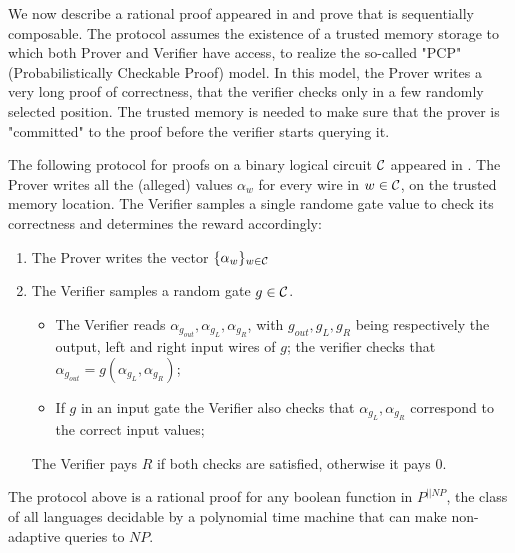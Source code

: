\begin{comment}
In this subsection we:
- describe PCP's protocol by AM
- describe certain assumptions on cost
- we prove that it is a Sequential Rational Proofs
\end{comment}

We now describe a rational proof appeared in \cite{am1} and prove that is sequentially composable.
The protocol assumes the existence of a trusted memory storage to which both 
Prover and Verifier have access, to realize the so-called "PCP" (Probabilistically Checkable Proof) model. In this model, the Prover 
writes a very long proof of correctness, that the verifier checks only in a few randomly selected position. The trusted memory is needed to 
make sure that the prover is "committed" to the proof before the verifier starts querying it. 

The following protocol for proofs on a binary logical circuit $\cal C$ 
appeared  in  \cite{am1}. The Prover writes all the (alleged) values $\alpha_w$ for every wire in $w \in {\cal C}$, 
on the trusted memory location. The Verifier 
samples a single randome gate value to check its correctness and determines the reward accordingly:
\begin{enumerate}
\item The Prover writes the vector $\{ \alpha_w\}_{w \in {\cal C}}$
\item The Verifier samples a random gate $g \in \cal C$.
\begin{itemize}
\item  The Verifier reads $\alpha_{g_{out}}, \alpha_{g_L}, \alpha_{g_R}$, with $g_{out}, g_L, g_R$ being respectively the output, left and right 
input wires of $g$; the verifier checks that $\alpha_{g_{out}} = g(\alpha_{g_L}, 
\alpha_{g_R})$;
\item If $g$ in an input gate the Verifier also checks that  $\alpha_{g_L}, \alpha_{g_R}$ correspond to the correct input values;
\end{itemize}
The Verifier pays $R$ if both checks are satisfied, otherwise it pays $0$.
\end{enumerate}

\begin{mythm}[\cite{am1}]
The protocol above is a rational proof for any boolean function in $
P^{||NP}$, the class of all languages decidable by a polynomial time machine 
that can make non-adaptive queries to $NP$.
\end{mythm}

